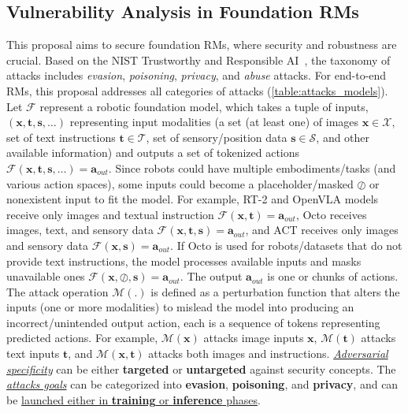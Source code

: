 \documentclass[11pt,letterpaper]{article}
\begin{document}
\subsection{Vulnerability Analysis in Foundation RMs}

This proposal aims to secure foundation RMs, where security and robustness are crucial.
Based on the NIST Trustworthy and Responsible AI~\cite{NIST_AI_100_2e2023}, the taxonomy of attacks includes \emph{evasion}, \emph{poisoning}, \emph{privacy}, and \emph{abuse} attacks. %
For end-to-end RMs, this proposal addresses all categories of attacks (\autoref{table:attacks_models}).%
\\
{Let $\mathcal{F}$ represent a robotic foundation model, which takes a tuple of inputs, \eg $(\bm{x}, \bm{t}, \bm{s}, \dots)$ representing input modalities (\ie a set (at least one) of images $\bm{x} \in \mathcal{X}$, set of text instructions $\bm{t} \in \mathcal{T}$, set of sensory/position data $\bm{s}\in \mathcal{S}$, and other available information) and outputs a set of tokenized actions $\mathcal{F}(\bm{x}, \bm{t}, \bm{s}, \dots)=\bm{a}_{out}$.
Since robots could have multiple embodiments/tasks (and various action spaces), some inputs could become a placeholder/masked $\oslash$ or nonexistent input to fit the model.}
For example, RT-2 and OpenVLA models receive only images and textual instruction $\mathcal{F}(\bm{x}, \bm{t})=\bm{a}_{out}$, 
Octo receives images, text, and sensory data $\mathcal{F}(\bm{x}, \bm{t}, \bm{s})=\bm{a}_{out}$, and ACT receives only images and sensory data $\mathcal{F}(\bm{x}, \bm{s})=\bm{a}_{out}$.
If Octo is used for robots/datasets that do not provide text instructions, the model processes available inputs and masks unavailable ones $\mathcal{F}(\bm{x}, \oslash,\bm{s})=\bm{a}_{out}$.
The output $\bm{a}_{out}$ is one or chunks of actions. 
The attack operation $\mathcal{M}(.)$ is defined as a perturbation function that alters the inputs (one or more 
modalities) to mislead the model into producing an incorrect/unintended output action, each is a sequence of tokens representing predicted actions.
For example, $\mathcal{M}(\bm{x})$ attacks image inputs $\bm{x}$, $\mathcal{M}(\bm{t})$ attacks text inputs $\bm{t}$, and $\mathcal{M}(\bm{x}, \bm{t})$ attacks both images and instructions.
\ul{\emph{Adversarial specificity}} can be either \textbf{targeted} or \textbf{untargeted} against security concepts. %
The \ul{\emph{attacks goals}} can be categorized into \textbf{evasion}, \textbf{poisoning}, and \textbf{privacy}, and can be \ul{launched either in \textbf{training} or \textbf{inference} phases}.
\end{document}
